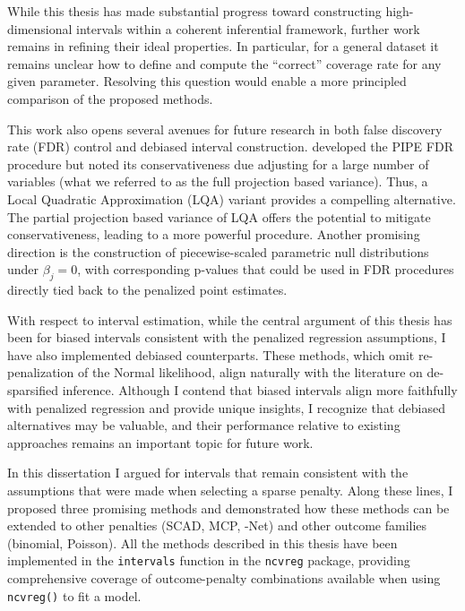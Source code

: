 \label{conclusion}

While this thesis has made substantial progress toward constructing high-dimensional intervals within a coherent inferential framework, further work remains in refining their ideal properties. In particular, for a general dataset it remains unclear how to define and compute the ``correct'' coverage rate for any given parameter. Resolving this question would enable a more principled comparison of the proposed methods.

This work also opens several avenues for future research in both false discovery rate (FDR) control and debiased interval construction. \citet{dai2019} developed the PIPE FDR procedure but noted its conservativeness due adjusting for a large number of variables (what we referred to as the full projection based variance). Thus, a Local Quadratic Approximation (LQA) variant provides a compelling alternative. The partial projection based variance of LQA offers the potential to mitigate conservativeness, leading to a more powerful procedure. Another promising direction is the construction of piecewise-scaled parametric null distributions under $\beta_j = 0$, with corresponding p-values that could be used in FDR procedures directly tied back to the penalized point estimates. 

With respect to interval estimation, while the central argument of this thesis has been for biased intervals consistent with the penalized regression assumptions, I have also implemented debiased counterparts. These methods, which omit re-penalization of the Normal likelihood, align naturally with the literature on de-sparsified inference. Although I contend that biased intervals align more faithfully with penalized regression and provide unique insights, I recognize that debiased alternatives may be valuable, and their performance relative to existing approaches remains an important topic for future work.

In this dissertation I argued for intervals that remain consistent with the assumptions that were made when selecting a sparse penalty. Along these lines, I proposed three promising methods and demonstrated how these methods can be extended to other penalties (SCAD, MCP, -Net) and other outcome families (binomial, Poisson). All the methods described in this thesis have been implemented in the \texttt{intervals} function in the \texttt{ncvreg} package, providing comprehensive coverage of outcome-penalty combinations available when using \texttt{ncvreg()} to fit a model. 

